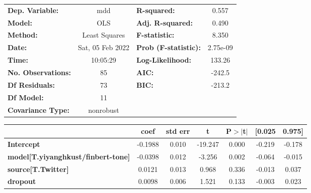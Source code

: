 \begin{center}
\begin{tabular}{lclc}
\toprule
\textbf{Dep. Variable:}                    &       mdd        & \textbf{  R-squared:         } &     0.557   \\
\textbf{Model:}                            &       OLS        & \textbf{  Adj. R-squared:    } &     0.490   \\
\textbf{Method:}                           &  Least Squares   & \textbf{  F-statistic:       } &     8.350   \\
\textbf{Date:}                             & Sat, 05 Feb 2022 & \textbf{  Prob (F-statistic):} &  2.75e-09   \\
\textbf{Time:}                             &     10:05:29     & \textbf{  Log-Likelihood:    } &    133.26   \\
\textbf{No. Observations:}                 &          85      & \textbf{  AIC:               } &    -242.5   \\
\textbf{Df Residuals:}                     &          73      & \textbf{  BIC:               } &    -213.2   \\
\textbf{Df Model:}                         &          11      & \textbf{                     } &             \\
\textbf{Covariance Type:}                  &    nonrobust     & \textbf{                     } &             \\
\bottomrule
\end{tabular}
\begin{tabular}{lcccccc}
                                           & \textbf{coef} & \textbf{std err} & \textbf{t} & \textbf{P$> |$t$|$} & \textbf{[0.025} & \textbf{0.975]}  \\
\midrule
\textbf{Intercept}                         &      -0.1988  &        0.010     &   -19.247  &         0.000        &       -0.219    &       -0.178     \\
\textbf{model[T.yiyanghkust/finbert-tone]} &      -0.0398  &        0.012     &    -3.256  &         0.002        &       -0.064    &       -0.015     \\
\textbf{source[T.Twitter]}                 &       0.0121  &        0.013     &     0.968  &         0.336        &       -0.013    &        0.037     \\
\textbf{dropout}                           &       0.0098  &        0.006     &     1.521  &         0.133        &       -0.003    &        0.023     \\

\end{tabular}
\end{center}
